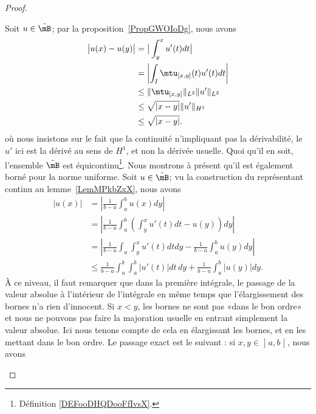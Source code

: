 \begin{proof}
\begin{enumerate}
		      Soit \( u\in \tilde \mB\); par la proposition~\ref{PropGWOIoDg}, nous avons
		      \begin{subequations}
			      \begin{align}
				      \big| u(x)-u(y) \big| & =\big| \int_y^xu'(t)dt \big|                                      \\
				                            & =\left| \int_I\mtu_{[x,y]}(t)u'(t)dt \right|                      \\
				                            & \leq\| \mtu_{\mathopen[ x , y \mathclose]} \|_{L^2}\| u' \|_{L^2} \\
				                            & \leq\sqrt{| x-y |}\| u' \|_{H^1}                                  \\
				                            & \leq\sqrt{| x-y |}.
			      \end{align}
		      \end{subequations}
		      où nous insistons sur le fait que la continuité n'impliquant pas la dérivabilité, le \( u'\) ici est la dérivé au sens de \( H^1\), et non la dérivée usuelle. Quoi qu'il en soit, l'ensemble \(\tilde  \mB\) est équicontinu\footnote{Définition \ref{DEFooDHQDooFfIvsX}.}. Nous montrons à présent qu'il est également borné pour la norme uniforme. Soit \( u\in\tilde \mB\); vu la construction du représentant continu au lemme~\ref{LemMPkbZxX}, nous avons
		      \begin{subequations}
			      \begin{align}
				      \big| u(x) \big| & =\left| \frac{1}{ b-a }\int_a^bu(x)dy \right|                                                           \\
				                       & =\left| \frac{1}{ b-a }\int_a^b\left( \int_y^xu'(t)dt-u(y) \right)dy \right|                            \\
				                       & =\left| \frac{1}{ b-a }\int_a\int_y^xu'(t)dtdy-\frac{1}{ b-a }\int_a^b u(y)dy \right|                   \\
				                       & \leq\frac{1}{ b-a }\int_a^b\int_a^b| u'(t) |dt\,dy+\frac{1}{ b-a }\int_a^b| u(y) |dy \label{EqCFwSOxh}.
			      \end{align}
		      \end{subequations}
		      À ce niveau, il faut remarquer que dans la première intégrale, le passage de la valeur absolue à l'intérieur de l'intégrale en même temps que l'élargissement des bornes n'a rien d'innocent. Si \( x<y\), les bornes ne sont pas «dans le bon ordre» et nous ne pouvons pas faire la majoration usuelle en entrant simplement la valeur absolue. Ici nous tenons compte de cela en élargissant les bornes, et en les mettant dans le bon ordre. Le passage exact est le suivant : si \( x,y\in\mathopen] a , b \mathclose[\), nous avons

\end{enumerate}
\end{proof}

